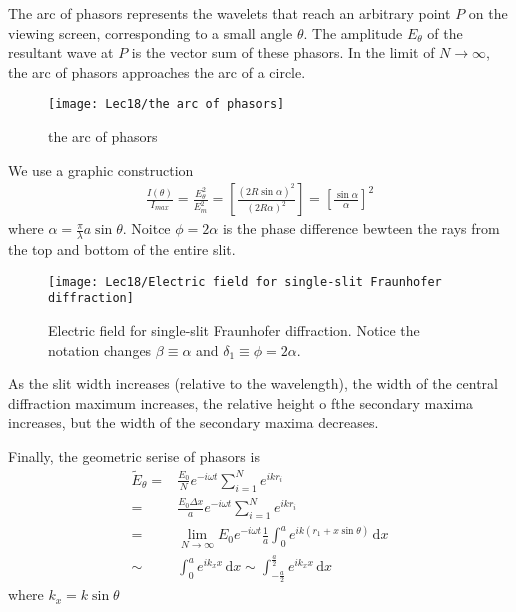 The arc of phasors represents the wavelets that reach an arbitrary point $P$ on the viewing screen, corresponding to a small angle $\theta$. The amplitude $E_{\theta}$ of the resultant wave at $P$ is the vector sum of these phasors. In the limit of $N \longrightarrow \infty$, the arc of phasors approaches the arc of a circle. 

\begin{figure}[H]
    \centering
    \texttt{[image: Lec18/the arc of phasors]}
    \caption{the arc of phasors}
\end{figure}

We use a graphic construction
\begin{align*}
    \frac{I(\theta)}{I_{max}}=\frac{E_{\theta}^2}{E_m^2}=\left[ \frac{\left( 2R\sin\alpha \right)^2}{\left( 2R\alpha \right)^2} \right]=\left[ \frac{\sin\alpha}{\alpha} \right]^2
\end{align*}
where $\alpha=\frac{\pi}{\lambda}a\sin\theta$. Noitce $\phi=2\alpha$ is the phase difference bewteen the rays from the top and bottom of the entire slit. 

\begin{figure}[H]
    \centering
    \texttt{[image: Lec18/Electric field for single-slit Fraunhofer diffraction]}
    \caption{Electric field for single-slit Fraunhofer diffraction. Notice the notation changes $\beta\equiv\alpha$ and $\delta_1\equiv\phi=2\alpha$.}
\end{figure}

As the slit width increases (relative to the wavelength), the width of the central diffraction maximum increases,
the relative height o fthe secondary maxima increases, but the width of the secondary maxima decreases. 

Finally, the geometric serise of phasors is 
\begin{align*}
    \tilde{E}_{\theta}=&\frac{E_0}{N} e^{-i\omega t} \sum_{i=1}^N e^{ikr_i}\\
    =&\frac{E_0 \Delta x}{a} e^{-i\omega t} \sum_{i=1}^N e^{ikr_i}\\
    =&\lim_{N\rightarrow \infty} E_0 e^{-i\omega t}\frac{1}{a}\int_0^a e^{ik(r_1+x\sin\theta)}\,\mathrm{d}x\\
    \sim&\int_0^a e^{ik_x x}\,\mathrm{d} x
    \sim \int_{-\frac{a}{2}}^{\frac{a}{2}} e^{ik_x x}\,\mathrm{d}x
\end{align*}
where $k_x=k\sin\theta$

